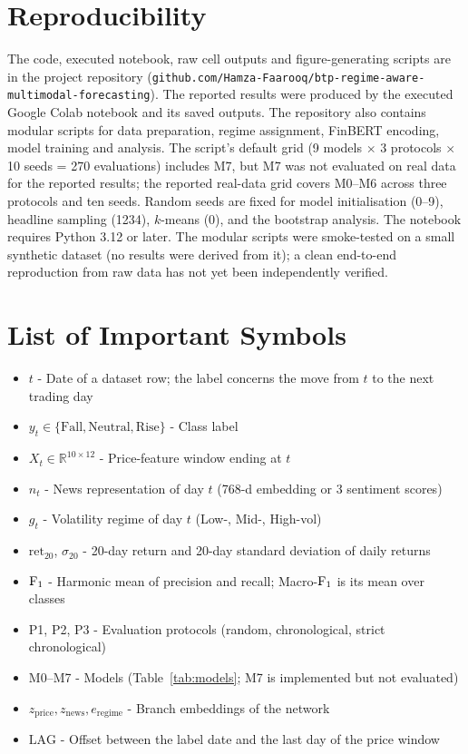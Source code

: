 \section{Reproducibility}
The code, executed notebook, raw cell outputs and figure-generating scripts are in the project repository
(\texttt{github.com/Hamza-Faarooq/btp-regime-aware-multimodal-forecasting}). The reported results were produced by the executed Google Colab notebook and its saved outputs. The repository also contains modular scripts for data preparation, regime assignment, FinBERT encoding, model training and analysis. The script's default grid (9 models $\times$ 3 protocols $\times$ 10 seeds = 270 evaluations) includes M7, but M7 was not evaluated on real data for the reported results; the reported real-data grid covers M0--M6 across three protocols and ten seeds. Random seeds are fixed for model initialisation (0--9), headline sampling (1234), $k$-means (0), and the bootstrap analysis. The notebook requires Python 3.12 or later. The modular scripts were smoke-tested on a small synthetic dataset (no results were derived from it); a clean end-to-end reproduction from raw data has not yet been independently verified.

\section*{List of Important Symbols}
\begin{itemize}
\item $t$ - Date of a dataset row; the label concerns the move from $t$ to the next trading day
\item $y_t\in\{\text{Fall},\text{Neutral},\text{Rise}\}$ - Class label
\item $X_t\in\mathbb{R}^{10\times 12}$ - Price-feature window ending at $t$
\item $n_t$ - News representation of day $t$ (768-d embedding or 3 sentiment scores)
\item $g_t$ - Volatility regime of day $t$ (Low-, Mid-, High-vol)
\item $\mathrm{ret}_{20}$, $\sigma_{20}$ - 20-day return and 20-day standard deviation of daily returns
\item $\mathrm{F}_1$ - Harmonic mean of precision and recall; Macro-$\mathrm{F}_1$ is its mean over classes
\item P1, P2, P3 - Evaluation protocols (random, chronological, strict chronological)
\item M0--M7 - Models (Table~\ref{tab:models}; M7 is implemented but not evaluated)
\item $z_{\text{price}}, z_{\text{news}}, e_{\text{regime}}$ - Branch embeddings of the network
\item $\mathrm{LAG}$ - Offset between the label date and the last day of the price window
\end{itemize}

